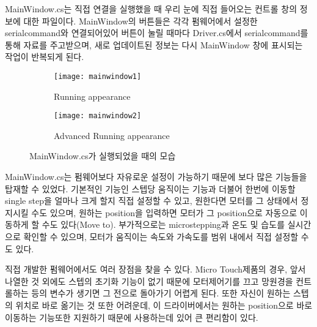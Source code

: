 MainWindow.cs는 직접 연결을 실행했을 때 우리 눈에 직접 들어오는 컨트롤 창의 정보에 대한 파일이다. MainWindow의 버튼들은 각각 펌웨어에서 설정한 serialcommand와 연결되어있어 버튼이 눌릴 때마다 Driver.cs에서 serialcommand를 통해 자료를 주고받으며, 새로 업데이트된 정보는 다시 MainWindow 창에 표시되는 작업이 반복되게 된다. 

\begin{figure}[h]
	\begin{subfigure}{0.5\textwidth}
		\begin{center}
			\texttt{[image: mainwindow1]} 
		\end{center}	
		\caption{Running appearance}
		\label{fig:mainwindow1}
	\end{subfigure}
	\begin{subfigure}{0.5\textwidth}
		\begin{center}			
			\texttt{[image: mainwindow2]}
		\end{center}
		\caption{Advanced Running appearance}
		\label{fig:mainwindow2}
	\end{subfigure}
	\caption{MainWindow.cs가 실행되었을 때의 모습}
	\label{fig:mainwindow}
\end{figure}

MainWindow.cs는 펌웨어보다 자유로운 설정이 가능하기 때문에 보다 많은 기능들을 탑재할 수 있었다. 기본적인 기능인 스텝당 움직이는 기능과 더불어 한번에 이동할 single step을 얼마나 크게 할지 직접 설정할 수 있고, 원한다면 모터를 그 상태에서 정지시킬 수도 있으며, 원하는 position을 입력하면 모터가 그 position으로 자동으로 이동하게 할 수도 있다(Move to). 부가적으로는 microstepping과 온도 및 습도를 실시간으로 확인할 수 있으며, 모터가 움직이는 속도와 가속도를 범위 내에서 직접 설정할 수도 있다.


직접 개발한 펌웨어에서도 여러 장점을 찾을 수 있다. Micro Touch제품의 경우, 앞서 나열한 것 외에도 스텝의 초기화 기능이 없기 때문에 모터제어기를 끄고 망원경을 컨트롤하는 등의 변수가 생기면 그 전으로 돌아가기 어렵게 된다. 또한 자신이 원하는 스텝의 위치로 바로 옮기는 것 또한 어려운데, 이 드라이버에서는 원하는 position으로 바로 이동하는 기능또한 지원하기 때문에 사용하는데 있어 큰 편리함이 있다. 


